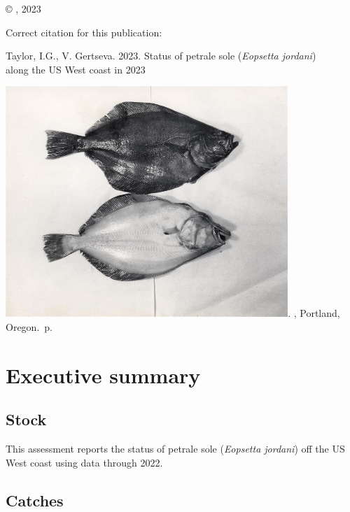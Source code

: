 \documentclass[11pt,
  english,
  letterpaper,
]{article}
\newcommand{\trTitle}{Status of petrale sole (\emph{Eopsetta jordani})\\
along the US West coast in 2023

\includegraphics[width=0.8\textwidth,height=0.8\textheight]{figures/petrale_sole_1945.jpg}}
\newcommand{\trYear}{2023}
\newcommand{\trAuthsBack}{Taylor, I.G., V. Gertseva}
\newcommand{\trCitation}{
\begin{hangparas}{1em}{1}
\trAuthsBack{}. \trYear{}. \trTitle{}. \glsentrylong{pfmc}, Portland, Oregon. \pageref{LastPage}{}\,p.
\end{hangparas}}
\begin{document}
\thispagestyle{empty}
\vspace*{\fill}
\begin{center}
\copyright{} , \trYear{}\\
\end{center}
\par
\bigskip
\noindent
Correct citation for this publication:
\bigskip
\par
\trCitation{}
\clearpage


\tableofcontents\clearpage
\label{TRlastRoman}
\clearpage

\newpage
\thispagestyle{empty} %

\pagestyle{plain}  %
\renewcommand*{\thefootnote}{\arabic{footnote}}  %
\setcounter{footnote}{0}  %
\renewcommand{\headrulewidth}{0.5pt}
\renewcommand{\footrulewidth}{0.5pt}

\newcommand{\lt}{\ensuremath <}
\newcommand{\gt}{\ensuremath >}

\pagebreak
{}
\setcounter{page}{1}

\renewcommand{\thetable}{\roman{table}}
\renewcommand{\thefigure}{\roman{figure}}

\setlength\parskip{0.5em plus 0.1em minus 0.2em}

\hypertarget{executive-summary}{%
\section*{Executive summary}\label{executive-summary}}

\hypertarget{stock}{%
\subsection*{Stock}\label{stock}}

This assessment reports the status of petrale sole (\emph{Eopsetta jordani}) off the US West coast using data through 2022.

\hypertarget{catches}{%
\subsection*{Catches}\label{catches}}
\end{document}
